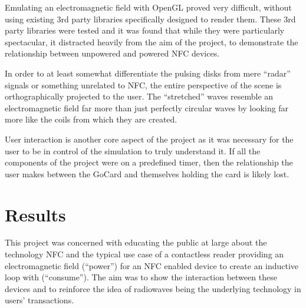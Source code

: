 \documentclass[a4paper]{article}
\begin{document}
Emulating an electromagnetic field with OpenGL proved very difficult, without using existing 3rd party libraries specifically designed to render them. These 3rd party libraries were tested and it was found that while they were particularly spectacular, it distracted heavily from the aim of the project, to demonstrate the relationship between unpowered and powered NFC devices. 

In order to at least somewhat differentiate the pulsing disks from mere ``radar'' signals or something unrelated to NFC, the entire perspective of the scene is orthographically projected to the user. The ``stretched'' waves resemble an electromagnetic field far more than just perfectly circular waves by looking far more like the coils from which they are created. 

User interaction is another core aspect of the project as it was necessary for the user to be in control of the simulation to truly understand it. If all the components of the project were on a predefined timer, then the relationship the user makes between the GoCard and themselves holding the card is likely lost. 


\section{Results}

This project was concerned with educating the public at large about the technology NFC and the typical use case of a contactless reader providing an electromagnetic field (``power'') for an NFC enabled device to create an inductive loop with (``consume''). The aim was to show the interaction between these devices and to reinforce the idea of radiowaves being the underlying technology in users' transactions. 
\end{document}
